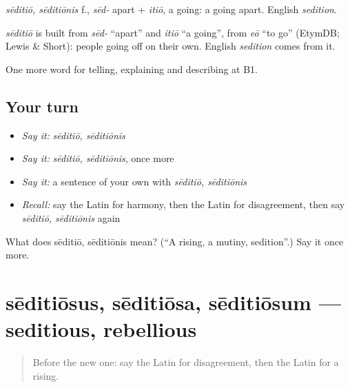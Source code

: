 \emph{sēditiō, sēditiōnis} f., \emph{sēd-} apart + \emph{itiō}, a going: a going apart. English \emph{sedition}.

\begin{cousinweb}
\emph{sēditiō} is built from \emph{sēd-} \textquotedblleft{}apart\textquotedblright{} and \emph{itiō} \textquotedblleft{}a going\textquotedblright{}, from \emph{eō} \textquotedblleft{}to go\textquotedblright{} (EtymDB; Lewis \& Short): people going off on their own. English \emph{sedition} comes from it.
\end{cousinweb}

\begin{grammarlens}[title={What you've built}]
One more word for telling, explaining and describing at B1.
\end{grammarlens}

\subsection*{Your turn}
\begin{itemize}
\raggedright
  \item \emph{Say it:} \emph{sēditiō, sēditiōnis}
  \item \emph{Say it:} \emph{sēditiō, sēditiōnis}, once more
  \item \emph{Say it:} a sentence of your own with \emph{sēditiō, sēditiōnis}
  \item \emph{Recall:} say the Latin for harmony, then the Latin for disagreement, then say \emph{sēditiō, sēditiōnis} again
\end{itemize}

\begin{tcolorbox}[breakable,colback=teal!4,colframe=teal!35!black,title={Before you move on}]
What does sēditiō, sēditiōnis mean? (\textquotedblleft{}A rising, a mutiny, sedition\textquotedblright{}.) Say it once more.
\end{tcolorbox}
\section[sēditiōsus, sēditiōsa, sēditiōsum]{sēditiōsus, sēditiōsa, sēditiōsum — seditious, rebellious}

\label{lesson:LA-C387-seditiosus}



\begin{quote}
Before the new one: say the Latin for disagreement, then the Latin for a rising.
\end{quote}

